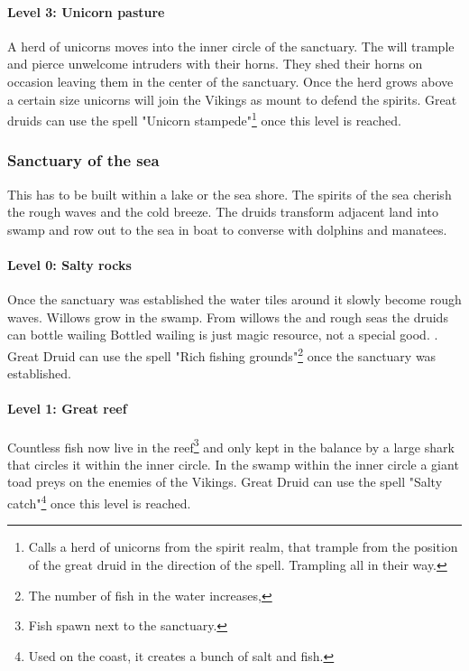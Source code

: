 \documentclass[a4paper]{article}
\begin{document}
			\paragraph{Level 3: Unicorn pasture}
				A herd of unicorns moves into the inner circle of the sanctuary.
				The will trample and pierce unwelcome intruders with their horns.
				They shed their horns on occasion leaving them in the center of the
				sanctuary.
				Once the herd grows above a certain size unicorns will join the \gls{Vikings}
				as mount to defend the spirits.
				Great druids can use the spell "Unicorn stampede"\footnote{
					Calls a herd of unicorns from the spirit realm,
					that trample from the position of the great druid
					in the direction of the spell.
					Trampling all in their way.
				} once this level is reached.

		\subsubsection{Sanctuary of the sea}
			This has to be built within a lake or the sea shore.
			The spirits of the sea cherish the rough waves and the cold breeze.
			The druids transform adjacent land into swamp and row out
			to the sea in boat to converse with dolphins and manatees.

			\paragraph{Level 0: Salty rocks}
				Once the sanctuary was established the water tiles around it slowly
				become rough waves.
				Willows grow in the swamp.
				From willows the and rough seas the druids can bottle wailing{
					Bottled wailing is just magic resource, not a special good.
				}.
				Great Druid can use the spell "Rich fishing grounds"\footnote{
					The number of fish in the water increases,
				} once the sanctuary was established.

			\paragraph{Level 1: Great reef}
				Countless fish now live in the reef\footnote{
					Fish spawn next to the sanctuary.
				}
				and only kept in the balance by a large shark that circles it within the inner circle.
				In the swamp within the inner circle a giant toad preys on the enemies of the \gls{Vikings}.
				Great Druid can use the spell "Salty catch"\footnote{
					Used on the coast, it creates a bunch of salt and fish.
				} once this level is reached.
\end{document}
